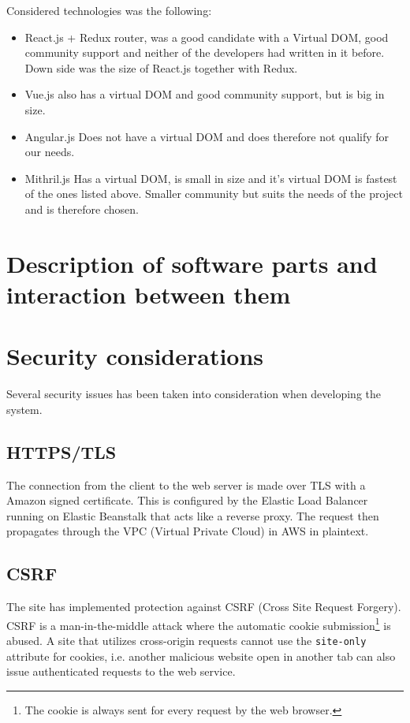 \documentclass[12pt,a4paper]{report}
\begin{document}
Considered technologies was the following:
\begin{itemize}
    \item React.js + Redux router, was a good candidate with a Virtual DOM, good community support and neither of the developers had written in it before. Down side was the size of React.js together with Redux.
    \item Vue.js also has a virtual DOM and good community support, but is big in size.
    \item Angular.js Does not have a virtual DOM and does therefore not qualify for our needs.
    \item Mithril.js Has a virtual DOM, is small in size and it's virtual DOM is fastest of the ones listed above. Smaller community but suits the needs of the project and is therefore chosen.
\end{itemize}

\chapter{Description of software parts and interaction between them}

\newpage

\chapter{Security considerations}
Several security issues has been taken into consideration when developing the system.

\section{HTTPS/TLS}
The connection from the client to the web server is made over TLS with a Amazon signed certificate.
This is configured by the Elastic Load Balancer running on Elastic Beanstalk that acts like a reverse proxy.
The request then propagates through the VPC (Virtual Private Cloud) in AWS in plaintext. 

\section{CSRF}
\label{subsec:csrf}
The site has implemented protection against CSRF (Cross Site Request Forgery). CSRF is a man-in-the-middle attack where the automatic cookie submission\footnote{The cookie is always sent for every request by the web browser.} is abused. A site that utilizes cross-origin requests cannot use the \texttt{site-only} attribute for cookies, i.e. another malicious website open in another tab can also issue authenticated requests to the web service\cite{rick}.
\end{document}
